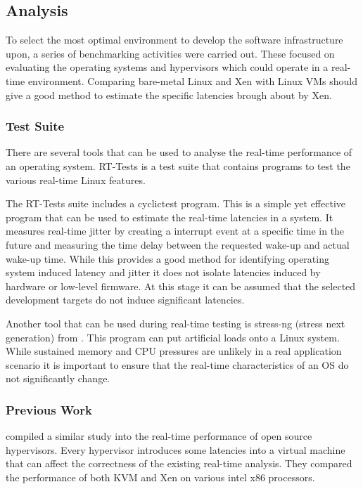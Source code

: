 \graphicspath{{main/design/runtime/graphics/}}

\subsection{Analysis}

To select the most optimal environment to develop the software infrastructure upon, a series of benchmarking activities were carried out. These focused on evaluating the operating systems and hypervisors which could operate in a real-time environment. Comparing bare-metal Linux and Xen with Linux VMs should give a good method to estimate the specific latencies brough about by Xen.

\subsubsection{Test Suite}
There are several tools that can be used to analyse the real-time performance of an operating system. RT-Tests is a test suite that contains programs to test the various real-time Linux features.

The RT-Tests suite includes a cyclictest program. This is a simple yet effective program that can be used to estimate the real-time latencies in a system. It measures real-time jitter by creating a interrupt event at a specific time in the future and measuring the time delay between the requested wake-up and actual wake-up time. While this provides a good method for identifying operating system induced latency and jitter it does not isolate latencies induced by hardware or low-level firmware. At this stage it can be assumed that the selected development targets do not induce significant latencies.

Another tool that can be used during real-time testing is stress-ng (stress next generation) from \textcite{kingColinIanKingStressng2024}. This program can put artificial loads onto a Linux system. While sustained memory and CPU pressures are unlikely in a real application scenario it is important to ensure that the real-time characteristics of an OS do not significantly change.

\clearpage

\subsubsection{Previous Work}

\textcite{abeniUsingXenKVM2020} compiled a similar study into the real-time performance of open source hypervisors. Every hypervisor introduces some latencies into a virtual machine that can affect the correctness of the existing real-time analysis. They compared the performance of both KVM and Xen on various intel x86 processors.

